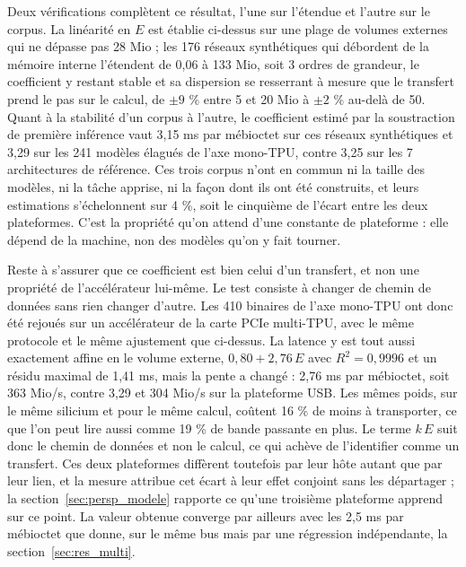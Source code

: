 \documentclass[11pt,a4paper]{report}
\begin{document}
Deux vérifications complètent ce résultat, l'une sur l'étendue et l'autre sur le corpus. La linéarité en $E$ est établie ci-dessus sur une plage de volumes externes qui ne dépasse pas 28 Mio ; les 176 réseaux synthétiques qui débordent de la mémoire interne l'étendent de 0,06 à 133 Mio, soit 3 ordres de grandeur, le coefficient y restant stable et sa dispersion se resserrant à mesure que le transfert prend le pas sur le calcul, de $\pm 9$ \% entre 5 et 20 Mio à $\pm 2$ \% au-delà de 50. Quant à la stabilité d'un corpus à l'autre, le coefficient estimé par la soustraction de première inférence vaut 3,15 ms par mébioctet sur ces réseaux synthétiques et 3,29 sur les 241 modèles élagués de l'axe mono-TPU, contre 3,25 sur les 7 architectures de référence. Ces trois corpus n'ont en commun ni la taille des modèles, ni la tâche apprise, ni la façon dont ils ont été construits, et leurs estimations s'échelonnent sur 4 \%, soit le cinquième de l'écart entre les deux plateformes. C'est la propriété qu'on attend d'une constante de plateforme : elle dépend de la machine, non des modèles qu'on y fait tourner.

Reste à s'assurer que ce coefficient est bien celui d'un transfert, et non une propriété de l'accélérateur lui-même. Le test consiste à changer de chemin de données sans rien changer d'autre. Les 410 binaires de l'axe mono-TPU ont donc été rejoués sur un accélérateur de la carte PCIe multi-TPU, avec le même protocole et le même ajustement que ci-dessus. La latence y est tout aussi exactement affine en le volume externe, $0{,}80 + 2{,}76\,E$ avec $R^2 = 0{,}9996$ et un résidu maximal de 1,41 ms, mais la pente a changé : 2,76 ms par mébioctet, soit 363 Mio/s, contre 3,29 et 304 Mio/s sur la plateforme USB. Les mêmes poids, sur le même silicium et pour le même calcul, coûtent 16 \% de moins à transporter, ce que l'on peut lire aussi comme 19 \% de bande passante en plus. Le terme $k\,E$ suit donc le chemin de données et non le calcul, ce qui achève de l'identifier comme un transfert. Ces deux plateformes diffèrent toutefois par leur hôte autant que par leur lien, et la mesure attribue cet écart à leur effet conjoint sans les départager ; la section~\ref{sec:persp_modele} rapporte ce qu'une troisième plateforme apprend sur ce point. La valeur obtenue converge par ailleurs avec les 2,5 ms par mébioctet que donne, sur le même bus mais par une régression indépendante, la section~\ref{sec:res_multi}.
\end{document}
